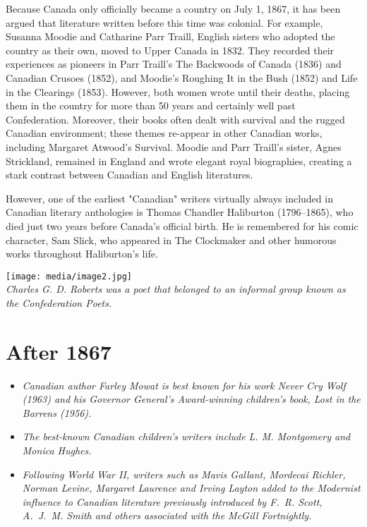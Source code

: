 Because Canada only officially became a country on July 1, 1867, it has
been argued that literature written before this time was colonial. For
example, Susanna Moodie and Catharine Parr Traill, English sisters who
adopted the country as their own, moved to Upper Canada in 1832. They
recorded their experiences as pioneers in Parr Traill's The Backwoods of
Canada (1836) and Canadian Crusoes (1852), and Moodie's Roughing It in
the Bush (1852) and Life in the Clearings (1853). However, both women
wrote until their deaths, placing them in the country for more than 50
years and certainly well past Confederation. Moreover, their books often
dealt with survival and the rugged Canadian environment; these themes
re-appear in other Canadian works, including Margaret Atwood's Survival.
Moodie and Parr Traill's sister, Agnes Strickland, remained in England
and wrote elegant royal biographies, creating a stark contrast between
Canadian and English literatures.

However, one of the earliest "Canadian" writers virtually always
included in Canadian literary anthologies is Thomas Chandler Haliburton
(1796--1865), who died just two years before Canada's official birth. He
is remembered for his comic character, Sam Slick, who appeared in The
Clockmaker and other humorous works throughout Haliburton's life.

\texttt{[image: media/image2.jpg]}\\
\emph{Charles G. D. Roberts was a poet that belonged to an informal
group known as the Confederation Poets.}

\section{After 1867}\label{after-1867}

\begin{itemize}
\item
  \emph{Canadian author Farley Mowat is best known for his work Never
  Cry Wolf (1963) and his Governor General's Award-winning children's
  book, Lost in the Barrens (1956).}
\item
  \emph{The best-known Canadian children's writers include L. M.
  Montgomery and Monica Hughes.}
\item
  \emph{Following World War II, writers such as Mavis Gallant, Mordecai
  Richler, Norman Levine, Margaret Laurence and Irving Layton added to
  the Modernist influence to Canadian literature previously introduced
  by F.~R. Scott, A.~J.~M. Smith and others associated with the McGill
  Fortnightly.}
\end{itemize}


